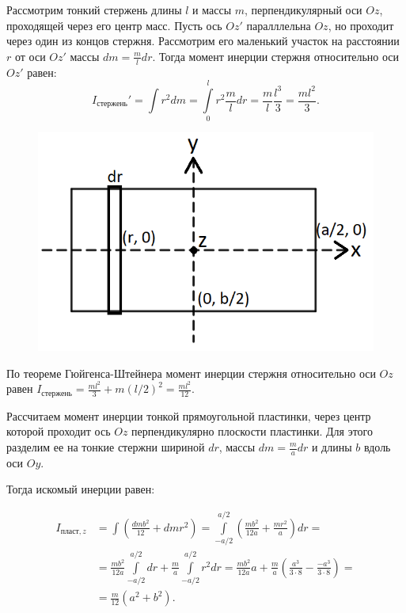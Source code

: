 \documentclass[a4paper, 12pt]{article}
\begin{document}
        Рассмотрим тонкий стержень длины $l$ и массы $m$, перпендикулярный оси $Oz$, проходящей через его центр масс. Пусть ось $Oz'$ паралллельна $Oz$, но проходит через один из концов стержня. Рассмотрим его маленький участок на расстоянии $r$ от оси $Oz'$ массы $dm = \frac{m}{l}dr$. Тогда момент инерции стержня относительно оси $Oz'$ равен:
        \begin{equation*}
            I_{стержень}' = \int r^2dm = \int\limits_0^lr^2\frac{m}{l}dr = \frac{m}{l}\frac{l^3}{3} = \frac{ml^2}{3}.
        \end{equation*}

        \begin{figure}
            \includegraphics[width=1.0\linewidth]{cubes_IxIy_2}
        \end{figure}
        По теореме Гюйгенса-Штейнера момент инерции стержня относительно оси $Oz$ равен $I_{стержень} = \frac{ml^2}{3} + m(l/2)^2 = \frac{ml^2}{12}$.
        
        Рассчитаем момент инерции тонкой прямоугольной пластинки, через центр которой проходит ось $Oz$ перпендикулярно плоскости пластинки. Для этого разделим ее на тонкие стержни шириной $dr$, массы $dm = \frac{m}{a}dr$ и длины $b$ вдоль оси $Oy$. 
        
        Тогда искомый инерции равен:
        
        \begin{equation*}
            \begin{aligned}
            I_{пласт, z} & = \int \left(\frac{dmb^2}{12} + dmr^2 \right) =
            \int\limits_{-a/2}^{a/2} \left(\frac{mb^2}{12a} + \frac{mr^2}{a} \right)dr = \\
            & = \frac{mb^2}{12a} \int\limits_{-a/2}^{a/2} dr + \frac{m}{a}\int\limits_{-a/2}^{a/2} r^2dr =
            \frac{mb^2}{12a}a + \frac{m}{a}\left(\frac{a^3}{3 \cdot 8} - \frac{-a^3}{3 \cdot 8} \right) = \\
            & = \frac{m}{12}(a^2 + b^2).
            \end{aligned}
        \end{equation*}
\end{document}

